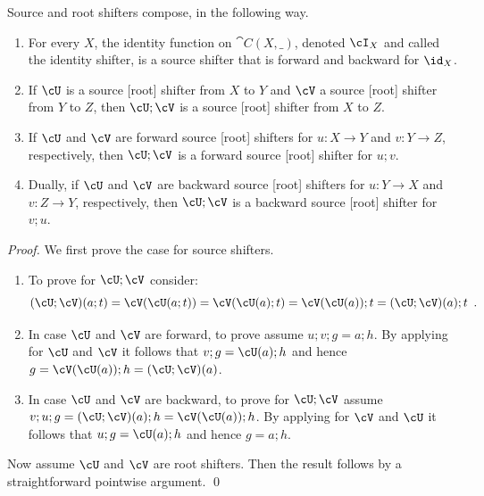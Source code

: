 %
Source and root shifters compose, in the following way.
%
\begin{proposition}
\begin{enumerate}[topsep=\smallskipamount]
\item For every $X$, the identity function on $\cat{C}(X,\_)$, denoted $\cI_X$ and called the identity shifter, is a source shifter that is forward and backward for $\id_X$.
\item If $\cU$ is a source [root] shifter from $X$ to $Y$ and $\cV$ a source [root] shifter from $Y$ to $Z$, then $\cU;\cV$ is a source [root] shifter from $X$ to $Z$. 
\item If $\cU$ and $\cV$ are forward source [root] shifters for $u: X\to Y$ and $v: Y \to Z$, respectively, then $\cU;\cV$ is a forward source [root] shifter for $u;v$.
\item Dually, if $\cU$ and $\cV$ are backward source [root] shifters for $u: Y\to X$ and $v: Z \to Y$, respectively, then $\cU;\cV$ is a backward source [root] shifter for $v;u$.
\end{enumerate}
\end{proposition}

\begin{fullorname}
\begin{proof}
We first prove the case for source shifters.
\begin{enumerate}
\item To prove  for $\cU;\cV$ consider:
\[ (\cU;\cV)(a;t) = \cV(\cU(a;t))= \cV(\cU(a);t)=\cV(\cU(a));t=(\cU;\cV)(a);t \enspace. \]

\item In case $\cU$ and $\cV$ are forward, to prove  assume $u;v;g=a;h$. By applying  for $\cU$ and $\cV$ it follows that $v;g=\cU(a);h$ and hence $g=\cV(\cU(a));h=(\cU;\cV)(a)$.

\item In case $\cU$ and $\cV$ are backward, to prove  for $\cU;\cV$ assume $v;u;g=(\cU;\cV)(a);h=\cV(\cU(a));h$. By applying  for $\cV$ and $\cU$ it follows that $u;g=\cU(a);h$ and hence $g=a;h$.
\end{enumerate}
%
Now assume $\cU$ and $\cV$ are root shifters. Then the result follows by a straightforward pointwise argument.
\qed
\end{proof}
\end{fullorname}

